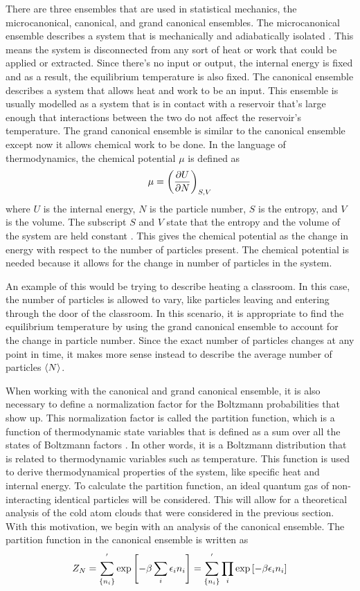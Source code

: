There are three ensembles that are used in statistical mechanics, the microcanonical, canonical, and grand canonical ensembles. The microcanonical ensemble describes a system that is mechanically and adiabatically isolated \cite{Kardar}. This means the system is disconnected from any sort of heat or work that could be applied or extracted. Since there's no input or output, the internal energy is fixed and as a result, the equilibrium temperature is also fixed. 
The canonical ensemble describes a system that allows heat and work to be an input. This ensemble is usually modelled as a system that is in contact with a reservoir that's large enough  that interactions between the two do not affect the reservoir's temperature. 
The grand canonical ensemble is similar to the canonical ensemble except now it allows chemical work to be done. In the language of thermodynamics, the chemical potential $\mu$ is defined as 
\begin{equation*}
    \mu=\qty(\frac{\partial U}{\partial N})_{S,V}
\end{equation*}
where $U$ is the internal energy, $N$ is the particle number, $S$ is the entropy, and $V$ is the volume. The subscript $S$ and $V$ state that the entropy and the volume of the system are held constant \cite{Blundell}. This gives the chemical potential as the change in energy with respect to the number of particles present. The chemical potential is needed because it allows for the change in number of particles in the system. 

An example of this would be trying to describe heating a classroom. In this case, the number of particles is allowed to vary, like particles leaving and entering through the door of the classroom. In this scenario, it is appropriate to find the equilibrium temperature by using the grand canonical ensemble to account for the change in particle number. Since the exact number of particles changes at any point in time, it makes more sense instead to describe the average number of particles $\left<{N}\right>$. 

When working with the canonical and grand canonical ensemble, it is also necessary to 
define a normalization factor for the Boltzmann probabilities that show up. This normalization factor is called the partition function, which is a function of thermodynamic state variables that is defined as a sum over all the states of Boltzmann factors \cite{Blundell}. In other words, it is a Boltzmann distribution that is related to thermodynamic variables such as temperature. This function is used to derive thermodynamical properties of the system, like specific heat and internal energy. 
To calculate the partition function, an ideal quantum gas of non-interacting identical particles will be considered. This will allow for a theoretical analysis of the cold atom clouds that were considered in the previous section. With this motivation, we begin with an analysis of the canonical ensemble. The partition function in the canonical ensemble is written as
\begin{equation}
    Z_N=\sum_{\{n_i\}}^{'} \exp\qty[-\beta\sum_{i} \epsilon_i n_i]=\sum_{\{n_i\}}^{'} \prod_i \exp\qty[-\beta\epsilon_i n_i]
\end{equation}

